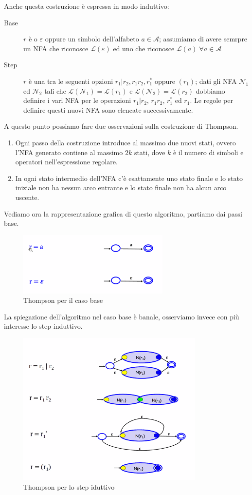 \documentclass[class=book, crop=false, oneside, 12pt]{standalone}
\begin{document}
Anche questa costruzione è espressa in modo induttivo:
\begin{description}
    \item[Base] \(r\) è o \(\varepsilon\) oppure un simbolo dell’alfabeto \(a \in \mathcal{A}\); assumiamo di avere semrpre un NFA che riconosce \(\mathcal{L}(\varepsilon)\) ed uno che riconosce \(\mathcal{L}(a) \; \forall a \in \mathcal{A}\)
    \item[Step] \(r\) è una tra le seguenti opzioni \(r_1 | r_2 , r_1 r_2 , r_1^* \) oppure \((r_1)\); dati gli NFA \(\mathcal{N}_1\) ed \(\mathcal{N}_2\) tali che \(\mathcal{L}(\mathcal{N}_1)=\mathcal{L}(r_1)\) e \(\mathcal{L}(\mathcal{N}_2)=\mathcal{L}(r_2)\) dobbiamo definire i vari NFA per le operazioni \(r_1|r_2\), \(r_1 r_2\), \(r_1^*\) ed \(r_1\). Le regole per definire questi nuovi NFA sono elencate successivamente.
\end{description}
A questo punto possiamo fare due osservazioni sulla costruzione di Thompson.
\begin{enumerate}
    \item Ogni passo della costruzione introduce al massimo due nuovi stati, ovvero l’NFA generato contiene al massimo \(2k\) stati, dove \(k\) è il numero di simboli e operatori nell’espressione regolare.
    \item In ogni stato intermedio dell’NFA c’è esattamente uno stato finale e lo stato iniziale non ha nessun arco entrante e lo stato finale non ha alcun arco uscente. 
\end{enumerate}
Vediamo ora la rappresentazione grafica di questo algoritmo, partiamo dai passi base.
\begin{figure}
    \centering
    \includegraphics[width=.5\textwidth,keepaspectratio]{Thompson_base}
    \caption{Thompson per il caso base}
    \label{Thompson_base}
\end{figure}
La spiegazione dell'algoritmo nel caso base è banale, osserviamo invece con più interesse lo step induttivo.
\begin{figure}
    \centering
    \includegraphics[width=.7\textwidth,keepaspectratio]{Thompson_step}
    \caption{Thompson per lo step iduttivo}
    \label{Thompson_step}
\end{figure}
\end{document}
